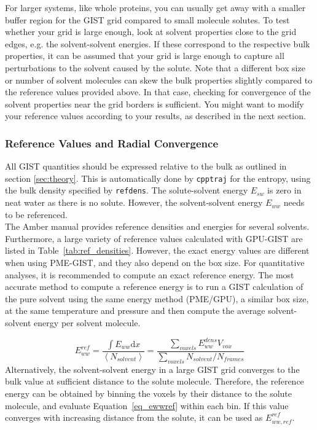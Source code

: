 \documentclass[9pt,tutorial,pubversion]{livecoms}
\newcommand{\software}{\texttt}
\newcommand\inlinecode{\texttt}
\begin{document}
For larger systems, like whole proteins, you can usually get away with a smaller buffer region for the GIST grid compared to small molecule solutes.
To test whether your grid is large enough, look at solvent properties close to the grid edges, e.g. the solvent-solvent energies.
If these correspond to the respective bulk properties, it can be assumed that your grid is large enough to capture all perturbations to the solvent caused by the solute.
Note that a different box size or number of solvent molecules can skew the bulk properties slightly compared to the reference values provided above.
In that case, checking for convergence of the solvent properties near the grid borders is sufficient. 
You might want to modify your reference values according to your results, as described in the next section.

\subsubsection{Reference Values and Radial Convergence}
All GIST quantities should be expressed relative to the bulk as outlined in section \ref{sec:theory}.
This is automatically done by \software{cpptraj} for the entropy, using the bulk density specified by \inlinecode{refdens}.
The solute-solvent energy $E_{sw}$ is zero in neat water as there is no solute.
However, the solvent-solvent energy $E_{ww}$ needs to be referenced.\\
The Amber manual provides reference densities and energies for several solvents.
Furthermore, a large variety of reference values calculated with GPU-GIST are listed in Table~\ref{tab:ref_densities}. 
However, the exact energy values are different when using PME-GIST, and they also depend on the box size.
For quantitative analyses, it is recommended to compute an exact reference energy.
The most accurate method to compute a reference energy is to run a GIST calculation of the pure solvent using the same energy method (PME/GPU), a similar box size, at the same temperature and pressure and then compute the average solvent-solvent energy per solvent molecule.

\begin{equation}
\label{eq_ewwref}
E_{ww}^\textit{ref} = \frac{\int{E_{ww}} \mathrm{d}x}{\left<N_\textit{solvent}\right>}
  = \frac{\sum_\textit{voxels}E_{ww}^\textit{dens} V_\textit{vox}}{\sum_\textit{voxels}{N_\textit{solvent}} / N_\textit{frames}}
\end{equation}
Alternatively, the solvent-solvent energy in a large GIST grid converges to the bulk value at sufficient distance to the solute molecule. 
Therefore, the reference energy can be obtained by binning the voxels by their distance to the solute molecule, and evaluate Equation~\ref{eq_ewwref} within each bin.
If this value converges with increasing distance from the solute, it can be used as $E_{ww, ref}^\textit{ref}$.
\end{document}
